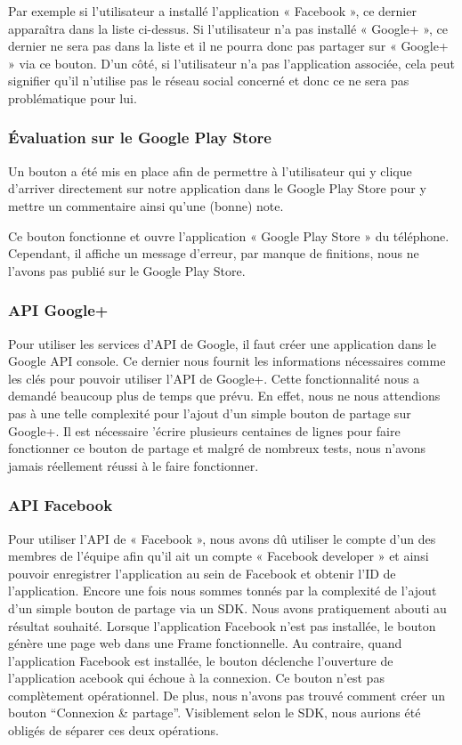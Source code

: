 \documentclass{report}
\begin{document}
Par exemple si l’utilisateur a installé l’application « Facebook », ce
dernier apparaîtra dans la liste ci-dessus. Si l’utilisateur n’a pas
installé « Google+ », ce dernier ne sera pas dans la liste et il ne
pourra donc pas partager sur « Google+ » via ce bouton. D’un côté, si
l’utilisateur n’a pas l’application associée, cela peut signifier qu’il
n’utilise pas le réseau social concerné et donc ce ne sera pas
problématique pour lui.

\subsubsection{Évaluation sur le Google Play Store}

Un bouton a été mis en place afin de permettre à l’utilisateur qui y
clique d’arriver directement sur notre application dans le Google Play
Store pour y mettre un commentaire ainsi qu’une (bonne) note.

Ce bouton fonctionne et ouvre l’application « Google Play Store » du
téléphone. Cependant, il affiche un message d’erreur, par manque de
finitions, nous ne l’avons pas publié sur le Google Play Store.

\subsubsection{API Google+}

Pour utiliser les services d’API de Google, il faut créer une
application dans le Google API console. Ce dernier nous fournit les
informations nécessaires comme les clés pour pouvoir utiliser l’API de
Google+. Cette fonctionnalité nous a demandé beaucoup plus de temps que
prévu. En effet, nous ne nous attendions pas à une telle complexité pour
l’ajout d’un simple bouton de partage sur Google+. Il est nécessaire
’écrire plusieurs centaines de lignes pour faire fonctionner ce bouton
de partage et malgré de nombreux tests, nous n’avons jamais réellement
réussi à le faire fonctionner.

\subsubsection{API Facebook}

Pour utiliser l’API de « Facebook », nous avons dû utiliser le compte
d’un des membres de l’équipe afin qu’il ait un compte « Facebook
developer » et ainsi pouvoir enregistrer l’application au sein de
Facebook et obtenir l’ID de l’application. Encore une fois nous sommes
tonnés par la complexité de l’ajout d’un simple bouton de partage via un
SDK. Nous avons pratiquement abouti au résultat souhaité. Lorsque
l’application Facebook n’est pas installée, le bouton génère une page
web dans une Frame fonctionnelle. Au contraire, quand l’application
Facebook est installée, le bouton déclenche l’ouverture de l’application
acebook qui échoue à la connexion. Ce bouton n’est pas complètement
opérationnel. De plus, nous n’avons pas trouvé comment créer un bouton
“Connexion \& partage”. Visiblement selon le SDK, nous aurions été
obligés de séparer ces deux opérations.
\end{document}
